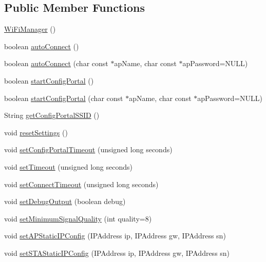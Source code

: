 \subsection*{Public Member Functions}
\begin{DoxyCompactItemize}
\item 
\hyperlink{class_wi_fi_manager_a7d2efc3a8d43169ad058fc1fe797e106}{Wi\+Fi\+Manager} ()
\item 
boolean \hyperlink{class_wi_fi_manager_ae3cdfa6b02edcfe63d7da4f696b62136}{auto\+Connect} ()
\item 
boolean \hyperlink{class_wi_fi_manager_ab1d094034e5e3e36e2e1b3624edad469}{auto\+Connect} (char const $\ast$ap\+Name, char const $\ast$ap\+Password=N\+U\+LL)
\item 
boolean \hyperlink{class_wi_fi_manager_ad781751307f7f623956126096a09a545}{start\+Config\+Portal} ()
\item 
boolean \hyperlink{class_wi_fi_manager_afaca5021edffb4d9a5bd39f7b0f7a686}{start\+Config\+Portal} (char const $\ast$ap\+Name, char const $\ast$ap\+Password=N\+U\+LL)
\item 
String \hyperlink{class_wi_fi_manager_a157dc79b810f8f8d338a6120b13f5c94}{get\+Config\+Portal\+S\+S\+ID} ()
\item 
void \hyperlink{class_wi_fi_manager_a0027749816b6c66bc845d7c5db760a33}{reset\+Settings} ()
\item 
void \hyperlink{class_wi_fi_manager_a904006cb4d2c769e93bfdef336853766}{set\+Config\+Portal\+Timeout} (unsigned long seconds)
\item 
void \hyperlink{class_wi_fi_manager_aa6493d59c284ff245edb767ff684756d}{set\+Timeout} (unsigned long seconds)
\item 
void \hyperlink{class_wi_fi_manager_a508fa98e77d165b29764f68d48b7a349}{set\+Connect\+Timeout} (unsigned long seconds)
\item 
void \hyperlink{class_wi_fi_manager_a70d7f17596b9f10c3e4770702ac991c5}{set\+Debug\+Output} (boolean debug)
\item 
void \hyperlink{class_wi_fi_manager_a8cc211e7e004a44798d5b422a874f94b}{set\+Minimum\+Signal\+Quality} (int quality=8)
\item 
void \hyperlink{class_wi_fi_manager_a70007205081cd9bfe4123b65553adf42}{set\+A\+P\+Static\+I\+P\+Config} (I\+P\+Address ip, I\+P\+Address gw, I\+P\+Address sn)
\item 
void \hyperlink{class_wi_fi_manager_a124d89536d0ba5b5bd117e6c44a53e8d}{set\+S\+T\+A\+Static\+I\+P\+Config} (I\+P\+Address ip, I\+P\+Address gw, I\+P\+Address sn)

\end{DoxyCompactItemize}
